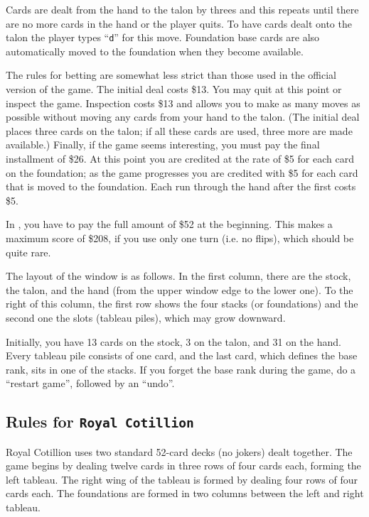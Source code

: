 Cards are dealt from the hand to the talon by threes
and this repeats until there are no more cards in the
hand or the player quits. To have cards dealt onto the
talon the player types ``{\tt d}'' for this move.
Foundation base cards are also automatically moved to the
foundation when they become available.

The rules for betting are somewhat less strict than
those used in the official version of the game. The
initial deal costs \$13. You may quit at this point or
inspect the game.  Inspection costs \$13 and allows you
to make as many moves as possible without moving
any cards from your hand to the talon.  (The initial
deal places three cards on the talon; if all these
cards are used, three more are made available.)
Finally, if the game seems interesting, you must pay
the final installment of \$26.  At this point you are
credited at the rate of \$5 for each card on the
foundation; as the game progresses you are credited
with \$5 for each card that is moved to the foundation.
Each run through the hand after the first costs \$5.

In \xpat, you have to pay the full amount of \$52 at
the beginning. This makes a maximum score of \$208, if
you use only one turn (i.e. no flips), which should be
quite rare.

The layout of the window is as follows.
In the first column, there are the stock, the talon,
and the hand (from the upper window edge to the lower one).
To the right of this column, the first row shows the
four stacks (or foundations) and the second one the
slots (tableau piles), which may grow downward.

Initially, you have 13 cards on the stock, 3 on the
talon, and 31 on the hand. Every tableau pile consists
of one card, and the last card, which defines the base rank,
sits in one of the stacks. If you forget the base rank
during the game, do a ``restart game'', followed by an
``undo''.


\subsection{Rules for {\tt Royal Cotillion}}
Royal Cotillion uses two standard 52-card decks (no
jokers) dealt together.  The game begins by dealing
twelve cards in three rows of four cards each, forming
the left tableau.  The right wing of the tableau is
formed by dealing four rows of four cards each.  The
foundations are formed in two columns between the left
and right tableau.

